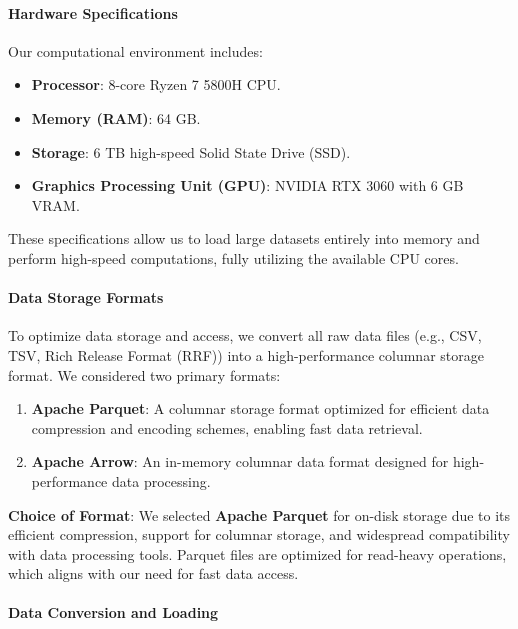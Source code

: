 \documentclass[12pt, a4paper]{article}
\begin{document}
\paragraph{Hardware Specifications}

Our computational environment includes:

\begin{itemize}
    \item \textbf{Processor}: 8-core Ryzen 7 5800H CPU.
    \item \textbf{Memory (RAM)}: 64 GB.
    \item \textbf{Storage}: 6 TB high-speed Solid State Drive (SSD).
    \item \textbf{Graphics Processing Unit (GPU)}: NVIDIA RTX 3060 with 6 GB VRAM.
\end{itemize}

These specifications allow us to load large datasets entirely into memory and perform high-speed computations, fully utilizing the available CPU cores.

\paragraph{Data Storage Formats}

To optimize data storage and access, we convert all raw data files (e.g., CSV, TSV, Rich Release Format (RRF)) into a high-performance columnar storage format. We considered two primary formats:

\begin{enumerate}
    \item \textbf{Apache Parquet}: A columnar storage format optimized for efficient data compression and encoding schemes, enabling fast data retrieval.
    \item \textbf{Apache Arrow}: An in-memory columnar data format designed for high-performance data processing.
\end{enumerate}

\textbf{Choice of Format}: We selected \textbf{Apache Parquet} for on-disk storage due to its efficient compression, support for columnar storage, and widespread compatibility with data processing tools. Parquet files are optimized for read-heavy operations, which aligns with our need for fast data access.

\paragraph{Data Conversion and Loading}
\end{document}
